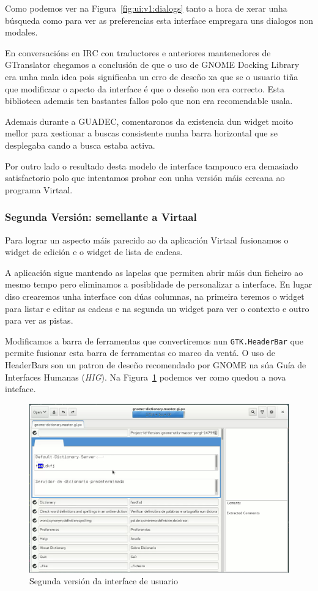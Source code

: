Como podemos ver na Figura~\ref{fig:ui:v1:dialogs} tanto a hora de xerar unha búsqueda como para ver as preferencias esta interface empregara uns dialogos non modales.

En conversacións en IRC con traductores e anteriores mantenedores de GTranslator chegamos a conclusión de que o uso de GNOME Docking Library era unha mala idea pois significaba un erro de deseño xa que se o usuario tiña que modificaar o apecto da interface é que o deseño non era correcto. Esta biblioteca ademais ten bastantes fallos polo que non era recomendable usala.

Ademais durante a GUADEC, comentaronos da existencia dun widget moito mellor para xestionar a buscas consistente nunha barra horizontal que se desplegaba cando a busca estaba activa.

Por outro lado o resultado desta modelo de interface tampouco era demasiado satisfactorio polo que intentamos probar con unha versión máis cercana ao programa Virtaal.

\subsubsection{Segunda Versión: semellante a Virtaal}

Para lograr un aspecto máis parecido ao da aplicación Virtaal fusionamos o widget de edición e o widget de lista de cadeas.

A aplicación sigue mantendo as lapelas que permiten abrir máis dun ficheiro ao mesmo tempo pero eliminamos a posiblidade de personalizar a interface. En lugar diso crearemos unha interface con dúas columnas, na primeira teremos o widget para listar e editar as cadeas e na segunda un widget para ver o contexto e outro para ver as pistas.

Modificamos a barra de ferramentas que convertiremos nun \lstinline{GTK.HeaderBar} que permite fusionar esta barra de ferramentas co marco da ventá. O uso de HeaderBars son un patron de deseño recomendado por GNOME na súa Guía de Interfaces Humanas (\emph{HIG}). Na Figura~\ref{fig:ui:v2:general} podemos ver como quedou a nova inteface.

\begin{figure}[h!]
  \centering
    \includegraphics[width=\textwidth]{img/curso2014_it1_ui.png}
    \caption{Segunda versión da interface de usuario}
    \label{fig:ui:v2:general}
\end{figure}

